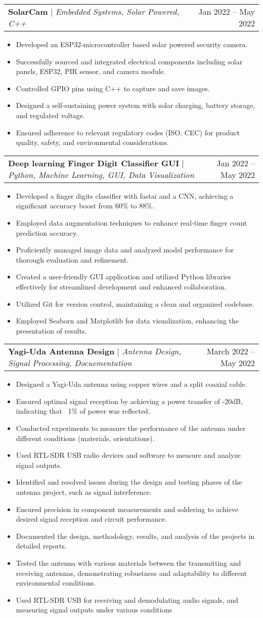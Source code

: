 \documentclass[A4,10pt]{article}
\makeatletter
\newcommand{\resumeItem}[1]{
  \item\small{
    {#1 \vspace{-2pt}}
  }
}
\newcommand{\resumeProjectHeading}[2]{
    \item
    \begin{tabular*}{0.97\textwidth}{l@{\extracolsep{\fill}}r}
      \small#1 & #2 \\
    \end{tabular*}\vspace{-7pt}
}
\newcommand{\resumeItemListStart}{\begin{itemize}}
\newcommand{\resumeItemListEnd}{\end{itemize}\vspace{-5pt}}
\makeatother
\begin{document}
        \resumeProjectHeading
        {\textbf{SolarCam} $|$ \emph{Embedded Systems, Solar Powered, C++}}{Jan 2022 -- May 2022}
        \resumeItemListStart
          \resumeItem{Developed an ESP32-microcontroller based solar powered security camera.}
          \resumeItem{Successfully sourced and integrated electrical components including solar panels, ESP32, PIR sensor, and camera module.}
          \resumeItem{Controlled GPIO pins using C++ to capture and save images.}
          \resumeItem{Designed a self-sustaining power system with solar charging, battery storage, and regulated voltage.}
          \resumeItem{Ensured adherence to relevant regulatory codes (ISO, CEC) for product quality, safety, and environmental considerations.}
        \resumeItemListEnd
        
        \resumeProjectHeading
        {\textbf{Deep learning Finger Digit Classifier GUI} $|$ \emph{Python, Machine Learning, GUI, Data Visualization}}{Jan 2022 -- May 2022}
        \resumeItemListStart
          \resumeItem{Developed a finger digits classifier with fastai and a CNN, achieving a significant accuracy boost from 60\% to 88\%.}
          \resumeItem{Employed data augmentation techniques to enhance real-time finger count prediction accuracy.}
          \resumeItem{Proficiently managed image data and analyzed model performance for thorough evaluation and refinement.}
          \resumeItem{Created a user-friendly GUI application and utilized Python libraries effectively for streamlined development and enhanced collaboration.}
          \resumeItem{Utilized Git for version control, maintaining a clean and organized codebase.}
          \resumeItem{Employed Seaborn and Matplotlib for data visualization, enhancing the presentation of results.}
        \resumeItemListEnd

        \resumeProjectHeading
        {\textbf{Yagi-Uda Antenna Design} $|$ \emph{Antenna Design, Signal Processing, Docuementation}}{March 2022 -- May 2022}
        \resumeItemListStart
          \resumeItem{Designed a Yagi-Uda antenna using copper wires and a split coaxial cable.}
          \resumeItem{Ensured optimal signal reception by achieving a power transfer of -20dB, indicating that ~1\% of power was reflected.}
          \resumeItem{Conducted experiments to measure the performance of the antenna under different conditions (materials, orientations).}
          \resumeItem{Used RTL-SDR USB radio devices and software to measure and analyze signal outputs.}
          \resumeItem{Identified and resolved issues during the design and testing phases of the antenna project, such as signal interference.}
          \resumeItem{Ensured precision in component measurements and soldering to achieve desired signal reception and circuit performance.}
          \resumeItem{Documented the design, methodology, results, and analysis of the projects in detailed reports.}
          \resumeItem{Tested the antenna with various materials between the transmitting and receiving antennas, demonstrating robustness and adaptability to different environmental conditions.}
          \resumeItem{Used RTL-SDR USB for receiving and demodulating audio signals, and measuring signal outputs under various conditions}
        \resumeItemListEnd
        
\end{document}
